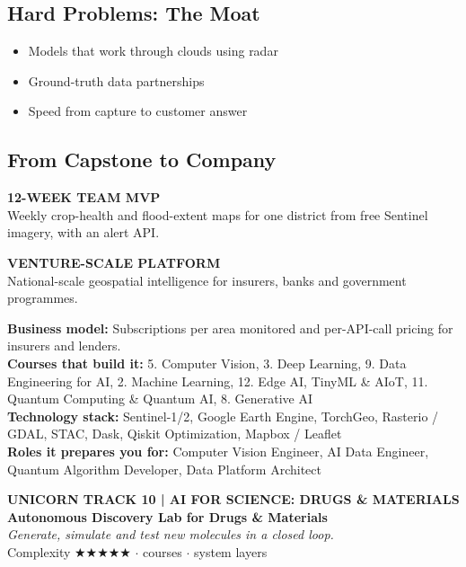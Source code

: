 \documentclass[10pt,a4paper]{article}
\begin{document}
\subsection*{Hard Problems: The Moat}\begin{itemize}\small
\item Models that work through clouds using radar
\item Ground-truth data partnerships
\item Speed from capture to customer answer
\end{itemize}
\subsection*{From Capstone to Company}
\begin{tcbraster}[raster columns=2,raster equal height,raster column skip=8pt]\begin{tcolorbox}[colback=l1bg,colframe=l1bg,arc=2pt,borderline north={2.5pt}{0pt}{saffron}]{\scriptsize\bfseries\color{muted}12-WEEK TEAM MVP}\\\small Weekly crop-health and flood-extent maps for one district from free Sentinel imagery, with an alert API.\end{tcolorbox}\begin{tcolorbox}[colback=l3bg,colframe=l3bg,arc=2pt,borderline north={2.5pt}{0pt}{igreen}]{\scriptsize\bfseries\color{muted}VENTURE-SCALE PLATFORM}\\\small National-scale geospatial intelligence for insurers, banks and government programmes.\end{tcolorbox}\end{tcbraster}
{\small\textbf{Business model:} Subscriptions per area monitored and per-API-call pricing for insurers and lenders.\\\textbf{Courses that build it:} 5. Computer Vision, 3. Deep Learning, 9. Data Engineering for AI, 2. Machine Learning, 12. Edge AI, TinyML \& AIoT, 11. Quantum Computing \& Quantum AI, 8. Generative AI\\\textbf{Technology stack:} Sentinel-1/2, Google Earth Engine, TorchGeo, Rasterio / GDAL, STAC, Dask, Qiskit Optimization, Mapbox / Leaflet\\\textbf{Roles it prepares you for:} Computer Vision Engineer, AI Data Engineer, Quantum Algorithm Developer, Data Platform Architect}
\newpage
\begin{tcolorbox}[colback=navy,colframe=navy,arc=2pt,left=8pt,top=5pt,bottom=5pt]{\small\bfseries\color{goldl}UNICORN TRACK 10 \;|\; AI FOR SCIENCE: DRUGS \& MATERIALS}\\[1pt]{\LARGE\bfseries\color{white}Autonomous Discovery Lab for Drugs \& Materials}\\[2pt]{\small\itshape\color{goldl}Generate, simulate and test new molecules in a closed loop.}\\[2pt]{\small\color{white}Complexity {\color{goldl}★★★★★} \;$\cdot$ courses \;$\cdot$ system layers}\end{tcolorbox}
\end{document}
